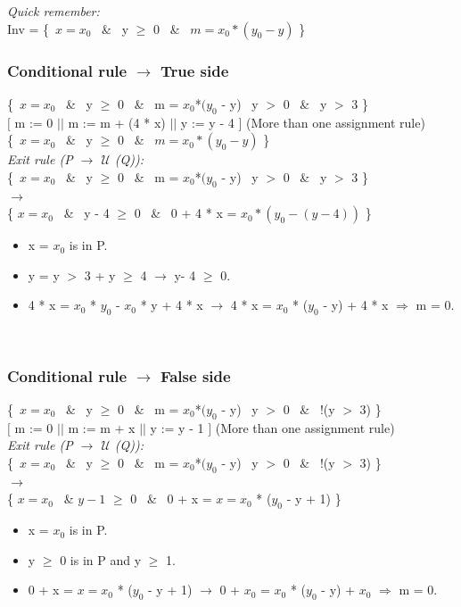 \documentclass[a4paper,12pt]{article}
\begin{document}
\textit{Quick remember:} \\
Inv = \{\ $x = x_{0}$ \ \& \ y $\geq$ 0 \ \& \ $m = x_{0}*(y_{0} - y)$ \}\

\subsubsection{Conditional rule $\rightarrow$ True side}
\{\ $x = x_{0}$ \ \& \ y $\geq$ 0 \ \& \ m = $x_{0}$*$(y_{0}$ - y) \ y $>$ 0 \ \& \ y $>$ 3 \}\ \\
$[$ m := 0 $||$ m := m + (4 * x) $||$ y := y - 4 $]$ (More than one assignment rule) \\
\{\ $x = x_{0}$ \ \& \ y $\geq$ 0 \ \& \ $m = x_{0}*(y_{0} - y)$ \}\ \\

\textit{Exit rule (P $\rightarrow$ $\mathcal{U}$ (Q)):} \\
\{\ $x = x_{0}$ \ \& \ y $\geq$ 0 \ \& \ m = $x_{0}$*$(y_{0}$ - y) \ y $>$ 0 \ \& \ y $>$ 3 \}\ \\
$\longrightarrow$ \\
\{ $x = x_{0}$ \ \& \ y - 4 $\geq$ 0 \ \& \ 0 + 4 * x = $x_{0} * (y_{0} - (y - 4))$ \}

\begin{itemize}[label = {\checkmark}]
    \item x = $x_{0}$ is in P.
    \item y = y $>$ 3 + y $\geq$ 4 $\rightarrow$ y- 4 $\geq$ 0.
    \item 4 * x = $x_{0}$ * $y_{0}$ - $x_{0}$ * y + 4 * x $\rightarrow$ 4 * x = $x_{0}$ * ($y_{0}$ - y) + 4 * x $\Rightarrow$ m = 0.
\end{itemize} \\
\newpage
\subsubsection{Conditional rule $\rightarrow$ False side}
\{\ $x = x_{0}$ \ \& \ y $\geq$ 0 \ \& \ m = $x_{0}$*$(y_{0}$ - y) \ y $>$ 0 \ \& \ !(y $>$ 3) \}\ \\
$[$ m := 0 $||$ m := m + x $||$ y := y - 1 $]$ (More than one assignment rule) \\

\textit{Exit rule (P $\rightarrow$ $\mathcal{U}$ (Q)):} \\
\{\ $x = x_{0}$ \ \& \ y $\geq$ 0 \ \& \ m = $x_{0}$*$(y_{0}$ - y) \ y $>$ 0 \ \& \ !(y $>$ 3) \}\ \\
$\longrightarrow$ \\
\{ $x = x_{0}$ \ \& $y - 1$ $\geq$ 0 \ \& \ 0 + x = $x = x_{0}$ * ($y_{0}$ - y + 1) \} \\
\begin{itemize}[label = {\checkmark}]
    \item x = $x_{0}$ is in P.
    \item y $\geq$ 0 is in P and y $\geq$ 1.
    \item 0 + x = $x = x_{0}$ * ($y_{0}$ - y + 1) $\rightarrow$ 0 + $x_{0}$ = $x_{0}$ * ($y_{0}$ - y) + $x_{0}$ $\Rightarrow$ m = 0.
\end{itemize} \\
\end{document}
